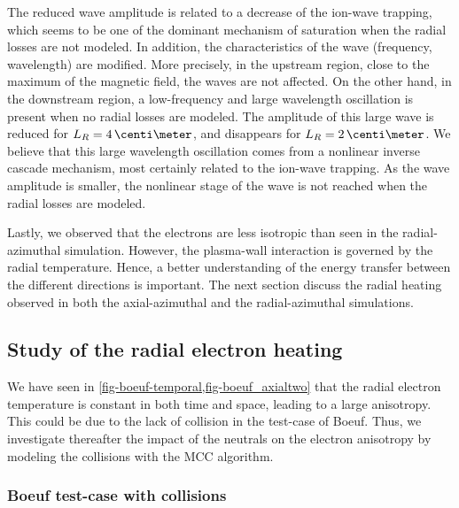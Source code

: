 The reduced wave amplitude is related to a decrease of the ion-wave trapping, which seems to be one of the dominant mechanism of saturation when the radial losses are not modeled.
In addition, the characteristics of the wave (frequency, wavelength) are modified.
More precisely, in the upstream region, close to the maximum of the magnetic field, the waves are not affected.
On the other hand,  in the downstream region, a low-frequency and large wavelength oscillation is present when no radial losses are modeled.
The amplitude of this large wave is reduced for $L_R=4\,\centi\meter$, and disappears for $L_R=2\,\centi\meter$.
We believe that this large wavelength oscillation comes from a nonlinear inverse cascade mechanism, most certainly related to the ion-wave trapping.
As the wave amplitude is smaller, the nonlinear stage of the wave is not reached when the radial losses are modeled.


\vspace{1em}
Lastly, we observed that the electrons are less isotropic than seen in the radial-azimuthal simulation.
However, the plasma-wall interaction is governed by the radial temperature.
Hence, a better understanding of the energy transfer between the different directions is important.
The next section discuss the radial heating observed in both the axial-azimuthal and the radial-azimuthal simulations.


\subsection{Study of the radial electron heating}
\label{sec-rheating}
    We have seen in \cref{fig-boeuf-temporal,fig-boeuf_axialtwo} that the radial electron temperature is constant in both time and space, leading to a large anisotropy.
    This could be due to the lack of collision in the test-case of Boeuf.
    Thus, we investigate thereafter the impact of the neutrals on the electron anisotropy by modeling the collisions with the \ac{MCC} algorithm.
    
  \subsubsection{Boeuf test-case with collisions} \label{subsec-MCC_boeuf}

